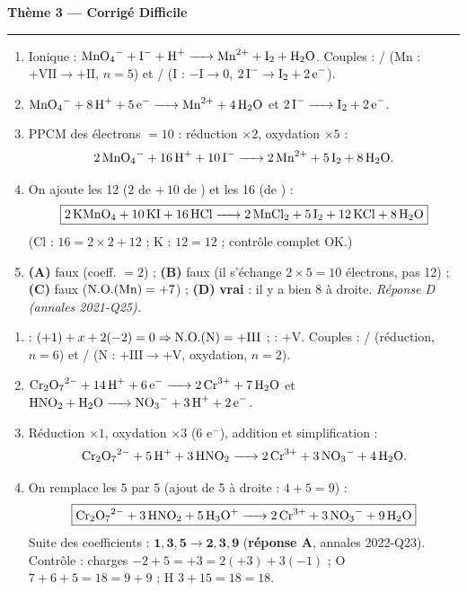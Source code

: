 \documentclass[11pt,a4paper]{article}
\newcommand{\NO}{\ensuremath{\mathrm{N.O.}}}
\begin{document}
\begin{center}
{\LARGE\bfseries\color{primarydark}Thème 3 — Corrigé Difficile}\\[-2pt]
{\color{corrcol}\rule{\textwidth}{1pt}}
\end{center}

\begin{corr}
\begin{enumerate}[label=\textbf{\alph*)},leftmargin=2.2em,topsep=2pt,itemsep=2pt]
  \item Ionique : $\ce{MnO4^- + I^- + H+ -> Mn^{2+} + I2 + H2O}$.
        Couples : / (Mn : $+\mathrm{VII}\to+\mathrm{II}$, $n=5$) et
        / (I : $-\mathrm{I}\to 0$, $2\,\ce{I^-}\to\ce{I2}+2\,\ce{e^-}$).
  \item $\ce{MnO4^- + 8 H+ + 5 e^- -> Mn^{2+} + 4 H2O}$ \quad et \quad $\ce{2 I^- -> I2 + 2 e^-}$.
  \item PPCM des électrons $=10$ : réduction $\times 2$, oxydation $\times 5$ :
        \[
        \ce{2 MnO4^- + 16 H+ + 10 I^- -> 2 Mn^{2+} + 5 I2 + 8 H2O}.
        \]
  \item On ajoute les 12  ($2$ de  $+\,10$ de ) et les 16  (de ) :
        \[
        \boxed{\ce{2 KMnO4 + 10 KI + 16 HCl -> 2 MnCl2 + 5 I2 + 12 KCl + 8 H2O}}
        \]
        (Cl : $16 = 2\times2 + 12$ ; K : $12=12$ ; contrôle complet OK.)
  \item \textbf{(A)} faux (coeff.  $=2$) ; \textbf{(B)} faux (il s'échange $2\times5=10$ électrons, pas 12) ;
        \textbf{(C)} faux ($\NO(\ce{Mn})=+7$) ; \textbf{(D)} \textbf{vrai} : il y a bien 8  à droite.
        \emph{Réponse D (annales 2021-Q25).}
\end{enumerate}
\end{corr}

\begin{corr}
\begin{enumerate}[label=\textbf{\alph*)},leftmargin=2.2em,topsep=2pt,itemsep=2pt]
  \item {} : $(+1)+x+2(-2)=0\Rightarrow \NO(\ce{N})=+\mathrm{III}$ ;  : $+\mathrm{V}$.
        Couples : / (réduction, $n=6$) et /
        (N : $+\mathrm{III}\to+\mathrm{V}$, oxydation, $n=2$).
  \item $\ce{Cr2O7^{2-} + 14 H+ + 6 e^- -> 2 Cr^{3+} + 7 H2O}$ \quad et \quad
        $\ce{HNO2 + H2O -> NO3^- + 3 H+ + 2 e^-}$.
  \item Réduction $\times 1$, oxydation $\times 3$ (6 e$^-$), addition et simplification :
        \[
        \ce{Cr2O7^{2-} + 5 H+ + 3 HNO2 -> 2 Cr^{3+} + 3 NO3^- + 4 H2O}.
        \]
  \item On remplace les 5  par 5  (ajout de 5  à droite : $4+5=9$) :
        \[
        \boxed{\ce{Cr2O7^{2-} + 3 HNO2 + 5 H3O+ -> 2 Cr^{3+} + 3 NO3^- + 9 H2O}}
        \]
        Suite des coefficients : $\mathbf{1,3,5 \to 2,3,9}$ (\textbf{réponse A}, annales 2022-Q23).
        Contrôle : charges $-2+5=+3=2(+3)+3(-1)$ ; O $7+6+5=18=9+9$ ; H $3+15=18=18$. \checkmark
\end{enumerate}
\end{corr}
\end{document}
